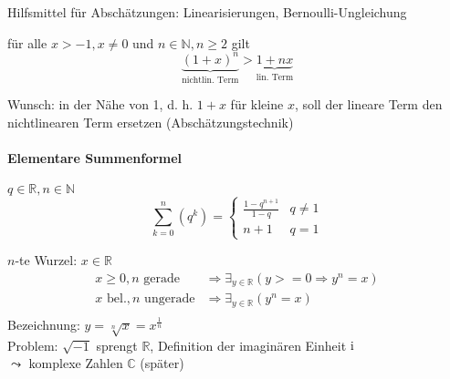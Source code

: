\induction


Hilfsmittel für Abschätzungen: Linearisierungen, Bernoulli-Ungleichung

\begin{proposition}
  für alle $x > -1, x \neq 0$ und $n \in \mathbb{N}, n \geq 2$ gilt
  \[ \underbrace{(1+x)^n}_\text{nichtlin. Term} > \underbrace{1+nx}_\text{lin. Term} \]
\end{proposition}

\induction

Wunsch: in der Nähe von 1, d. h. $1+x$ für kleine $x$, soll der lineare Term den nichtlinearen Term ersetzen (Abschätzungstechnik)

\paragraph{Elementare Summenformel}

\begin{theorem}
 $q \in \mathbb{R}, n \in \mathbb{N}$
 \[ \sum_{k=0}^n \left( q^k\right) = \begin{cases}\frac{1-q^{n+1}}{1-q} & q \neq 1 \\ n+1 & q = 1\end{cases} \]
\end{theorem}

\induction

\begin{definition} $n$-te Wurzel:
 $x\in \mathbb{R}$
 \begin{align*}
  x \geq 0, n \text{ gerade} &\Rightarrow \exists_{y \in \mathbb{R}} \left( y >= 0 \Rightarrow y^n = x \right) \\
  x \text{ bel.}, n \text{ ungerade} &\Rightarrow \exists_{y \in \mathbb{R}} \left( y^n = x \right) \\
 \end{align*}
Bezeichnung: $y = \sqrt[n]{x} = x^\frac 1 n$\\
Problem: $\sqrt{-1}$ sprengt $\mathbb{R}$, Definition der imaginären Einheit $\operatorname{i}$\\$\leadsto$ komplexe Zahlen $\mathbb{C}$ (später)
\end{definition}

